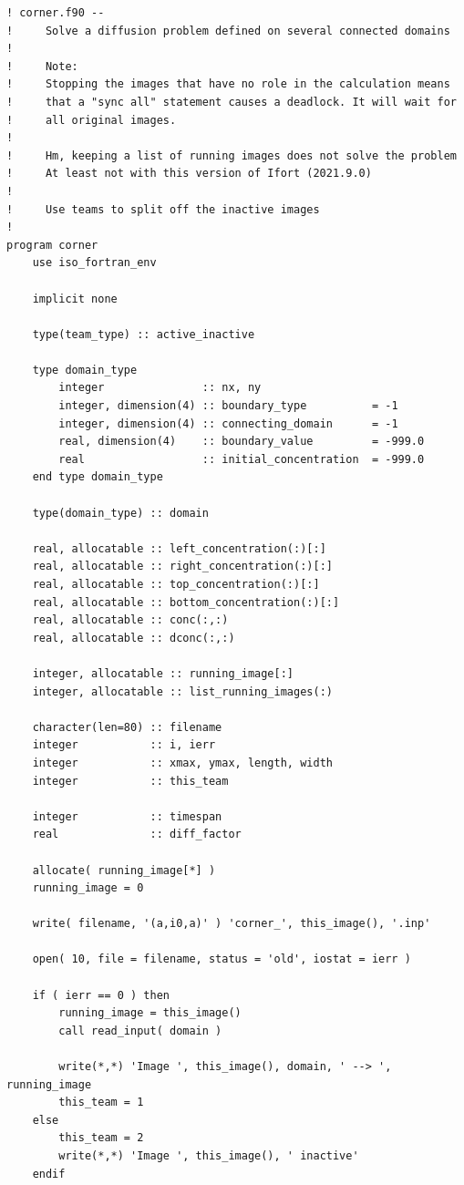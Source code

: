 \documentclass[onecolumn]{article}
\begin{document}
\begin{small}
\begin{verbatim}
! corner.f90 --
!     Solve a diffusion problem defined on several connected domains
!
!     Note:
!     Stopping the images that have no role in the calculation means
!     that a "sync all" statement causes a deadlock. It will wait for
!     all original images.
!
!     Hm, keeping a list of running images does not solve the problem
!     At least not with this version of Ifort (2021.9.0)
!
!     Use teams to split off the inactive images
!
program corner
    use iso_fortran_env

    implicit none

    type(team_type) :: active_inactive

    type domain_type
        integer               :: nx, ny
        integer, dimension(4) :: boundary_type          = -1
        integer, dimension(4) :: connecting_domain      = -1
        real, dimension(4)    :: boundary_value         = -999.0
        real                  :: initial_concentration  = -999.0
    end type domain_type

    type(domain_type) :: domain

    real, allocatable :: left_concentration(:)[:]
    real, allocatable :: right_concentration(:)[:]
    real, allocatable :: top_concentration(:)[:]
    real, allocatable :: bottom_concentration(:)[:]
    real, allocatable :: conc(:,:)
    real, allocatable :: dconc(:,:)

    integer, allocatable :: running_image[:]
    integer, allocatable :: list_running_images(:)

    character(len=80) :: filename
    integer           :: i, ierr
    integer           :: xmax, ymax, length, width
    integer           :: this_team

    integer           :: timespan
    real              :: diff_factor

    allocate( running_image[*] )
    running_image = 0

    write( filename, '(a,i0,a)' ) 'corner_', this_image(), '.inp'

    open( 10, file = filename, status = 'old', iostat = ierr )

    if ( ierr == 0 ) then
        running_image = this_image()
        call read_input( domain )

        write(*,*) 'Image ', this_image(), domain, ' --> ', running_image
        this_team = 1
    else
        this_team = 2
        write(*,*) 'Image ', this_image(), ' inactive'
    endif


\end{verbatim}
\end{small}
\end{document}
